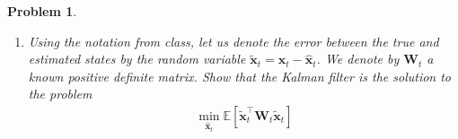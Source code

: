 \documentclass[11pt]{article}
\theoremstyle{plain} %
\newtheorem{problem}[theorem]{Problem}
\newenvironment{solution}
{\color{C2}\normalfont\begin{framed}\begingroup\textbf{Solution:} }
  {\endgroup\end{framed}}
\theoremstyle{remark}
\begin{document}
\begin{problem}
\begin{enumerate}[label=(\alph*)]
\begin{solution}
\begin{align*}
            \mathbf{P}_{t \mid t} :=\left(\mathbf{I}-\mathbf{K}_{t} \mathbf{H}_{t}\right) \mathbf{P}_{t \mid t-1} - \mathbf{K}_{t}\mathbf{M}_{t}^\top, ~~
            \mathbf{K}_{t} :=\mathbf{P}_{t \mid t-1} \mathbf{H}_{t}^\top  + \mathbf{M}_{t}, ~
            \mathbf{S}_{t} :=\mathbf{H}_{t} \mathbf{P}_{t \mid t-1} \mathbf{H}_{t}^\top+\mathbf{R}_{t} + \mathbf{H}_{t}\mathbf{M}_{t} + \mathbf{M}_{t}^\top\mathbf{H}_{t}^\top
          \end{align*}
          Specifically, $\mathbf{K}_{t}$ is called the Kalman gain. Clearly, our belief about
          $\mathbf{x}_{t}$ given $\mathbf{Y}_{t}$ is a multivariate Gaussian distribution.
        \end{solution}

  \item Using the notation from class, let us denote the error between the true
        and estimated states by the random variable
        $\widetilde{\mathbf{x}}_t=\mathbf{x}_t-\hat{\mathbf{x}}_t$. We denote by
        $\mathbf{W}_t$ a known positive definite matrix. Show that the Kalman filter
        is the solution to the problem
        \begin{align}
          \min_{\hat{\mathbf{x}}_t} \mathbb{E}\left[\widetilde{\mathbf{x}}_t^\top \mathbf{W}_t \widetilde{\mathbf{x}}_t\right]\label{eq: kalman}
        \end{align}


\end{enumerate}
\end{problem}
\end{document}
